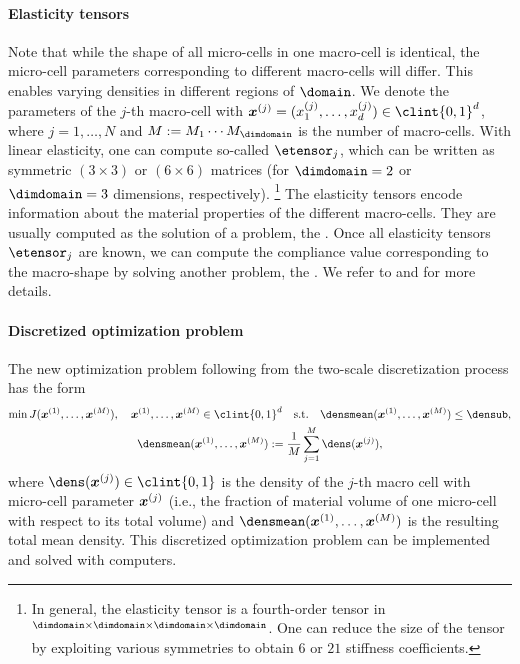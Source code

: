 \paragraph{Elasticity tensors}

Note that while the shape of all micro-cells in one macro-cell is identical,
the micro-cell parameters corresponding to different macro-cells will differ.
This enables varying densities in different regions of $\domain$.
We denote the parameters of the $j$-th macro-cell
with $\*x^{(j)} = (x_1^{(j)}, \dotsc, x_d^{(j)}) \in \clint{0, 1}^d$,
where $j = 1, \dotsc, N$ and
$M := M_1 \dotsm M_{\dimdomain}$ is the number of macro-cells.
With linear elasticity,
one can compute so-called  $\etensor_j$,
which can be written as
symmetric $(3 \times 3)$ or $(6 \times 6)$ matrices
(for $\dimdomain = 2$ or $\dimdomain = 3$ dimensions, respectively).%
\footnote{%
  In general, the elasticity tensor is a fourth-order tensor in
  $\real^{\dimdomain \times \dimdomain \times \dimdomain \times \dimdomain}$.
  One can reduce the size of the tensor by exploiting various symmetries
  \cite{Huebner14Mehrdimensionale}
  to obtain $6$ or $21$ stiffness coefficients.%
}
The elasticity tensors encode information about the material properties
of the different macro-cells.
They are usually computed as the solution of a \fem problem,
the .
Once all elasticity tensors $\etensor_j$ are known,
we can compute the compliance value corresponding to the macro-shape
by solving another \fem problem, the .
We refer to \cite{Allaire04Topology} and \cite{Huebner14Mehrdimensionale}
for more details.

\paragraph{Discretized optimization problem}

The new optimization problem following from the
two-scale discretization process has the form
\begin{subequations}
  \label{eq:topoOptProblemDiscrete}
  \begin{gather}
    \min J(\*x^{(1)}, \dotsc, \*x^{(M)}),\quad
    \*x^{(1)}, \dotsc, \*x^{(M)} \in \clint{0, 1}^d
    \quad\text{s.t.}\quad
    \densmean(\*x^{(1)}, \dotsc, \*x^{(M)}) \le \densub,\\
    \densmean(\*x^{(1)}, \dotsc, \*x^{(M)})
    := \frac{1}{M} \sum_{j=1}^M \dens(\*x^{(j)}),
  \end{gather}
\end{subequations}
where $\dens(\*x^{(j)}) \in \clint{0, 1}$ is the
density of the $j$-th macro cell with micro-cell parameter ${\boldsymbol{x}}^{(j)}$
(i.e., the fraction of material volume of one micro-cell
with respect to its total volume)
and $\densmean(\*x^{(1)}, \dotsc, \*x^{(M)})$ is the resulting
total mean density.
This discretized optimization problem can be implemented and
solved with computers.


